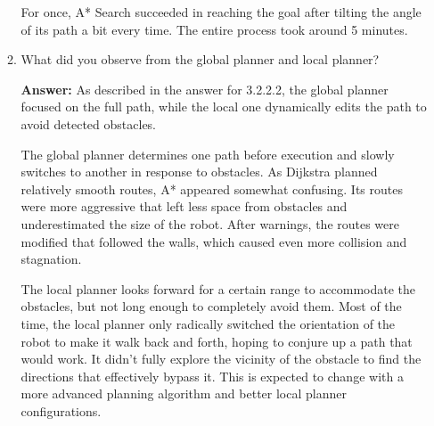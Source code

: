 \documentclass[12pt]{article}
\begin{document}
\begin{enumerate}
\begin{enumerate}
        For once, A* Search succeeded in reaching the goal after tilting the angle of its path a bit every time. The entire process took around 5 minutes.

        \item What did you observe from the global planner and local planner?
        
        \textbf{Answer: }As described in the answer for 3.2.2.2, the global planner focused on the full path, while the local one dynamically edits the path to avoid detected obstacles.

        The global planner determines one path before execution and slowly switches to another in response to obstacles. As Dijkstra planned relatively smooth routes, A* appeared somewhat confusing. Its routes were more aggressive that left less space from obstacles and underestimated the size of the robot. After warnings, the routes were modified that followed the walls, which caused even more collision and stagnation.

        The local planner looks forward for a certain range to accommodate the obstacles, but not long enough to completely avoid them. Most of the time, the local planner only radically switched the orientation of the robot to make it walk back and forth, hoping to conjure up a path that would work. It didn't fully explore the vicinity of the obstacle to find the directions that effectively bypass it. This is expected to change with a more advanced planning algorithm and better local planner configurations.

    \end{enumerate}

    \end{enumerate}
\end{document}

